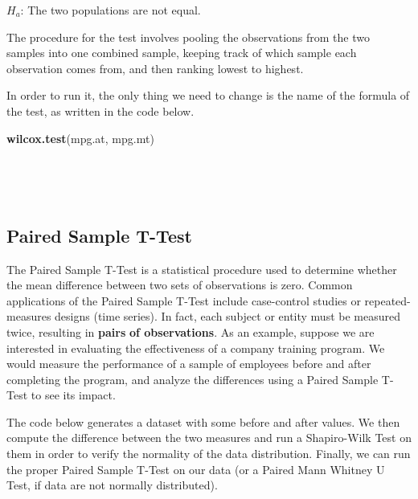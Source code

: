 \documentclass[
]{article}
\newenvironment{Shaded}{\begin{snugshade}}{\end{snugshade}}
\newcommand{\FunctionTok}[1]{\textcolor[rgb]{0.13,0.29,0.53}{\textbf{#1}}}
\newcommand{\NormalTok}[1]{#1}
\begin{document}
\(H_a\): The two populations are not equal.

The procedure for the test involves pooling the observations from the
two samples into one combined sample, keeping track of which sample each
observation comes from, and then ranking lowest to highest.

In order to run it, the only thing we need to change is the name of the
formula of the test, as written in the code below.

\begin{Shaded}
\begin{Highlighting}[]
\FunctionTok{wilcox.test}\NormalTok{(mpg.at, mpg.mt)}
\end{Highlighting}
\end{Shaded}

~

~

\hypertarget{paired-sample-t-test}{%
\subsection{Paired Sample T-Test}\label{paired-sample-t-test}}

The Paired Sample T-Test is a statistical procedure used to determine
whether the mean difference between two sets of observations is zero.
Common applications of the Paired Sample T-Test include case-control
studies or repeated-measures designs (time series). In fact, each
subject or entity must be measured twice, resulting in \textbf{pairs} \textbf{of
observations}. As an example, suppose we are interested in evaluating
the effectiveness of a company training program. We would measure the
performance of a sample of employees before and after completing the
program, and analyze the differences using a Paired Sample T-Test to see
its impact.

The code below generates a dataset with some before and after values. We
then compute the difference between the two measures and run a
Shapiro-Wilk Test on them in order to verify the normality of the data
distribution. Finally, we can run the proper Paired Sample T-Test on our
data (or a Paired Mann Whitney U Test, if data are not normally
distributed).
\end{document}
